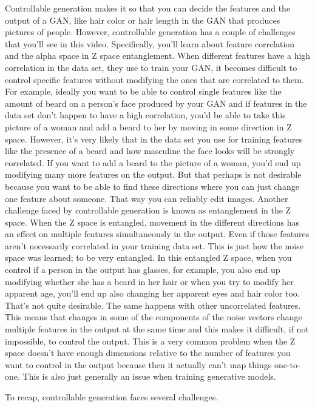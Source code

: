 \documentclass[11pt, onecolumn]{article}
\begin{document}
Controllable generation makes it so that you can
decide the features and the output of a GAN,
like hair color or hair length in
the GAN that produces pictures of people.
However, controllable generation has
a couple of challenges that you'll see in this video.
Specifically, you'll learn about feature correlation
and the alpha space in Z space entanglement.
When different features have a high
correlation in the data set,
they use to train your GAN,
it becomes difficult to control specific features without
modifying the ones that are correlated to them.
For example, ideally you want to be able to
control single features like the amount of
beard on a person's face produced by your GAN and if
features in the data set don't
happen to have a high correlation,
you'd be able to take this picture
of a woman and add a beard
to her by moving in some direction in Z space.
However, it's very likely that in
the data set you use for training features like
the presence of a beard and how masculine
the face looks will be strongly correlated.
If you want to add a beard to the picture of a woman,
you'd end up modifying many more features on the output.
But that perhaps is not
desirable because you want to be able to find
these directions where you can just
change one feature about someone.
That way you can reliably edit images.
Another challenge faced by controllable generation
is known as entanglement in the Z space.
When the Z space is entangled,
movement in the different directions has an effect
on multiple features simultaneously in the output.
Even if those features aren't
necessarily correlated in your training data set.
This is just how the noise space was learned;
to be very entangled.
In this entangled Z space,
when you control if a person in
the output has glasses, for example,
you also end up modifying whether she has a beard in
her hair or when you try to modify her apparent age,
you'll end up also changing
her apparent eyes and hair color too.
That's not quite desirable.
The same happens with other uncorrelated features.
This means that changes in some of
the components of the noise vectors change
multiple features in the output
at the same time and this makes it difficult,
if not impossible, to control the output.
This is a very common problem when
the Z space doesn't have enough dimensions relative to
the number of features you want to
control in the output because
then it actually can't map things one-to-one.
This is also just generally
an issue when training generative models.

To recap, controllable generation faces several challenges.
\end{document}
